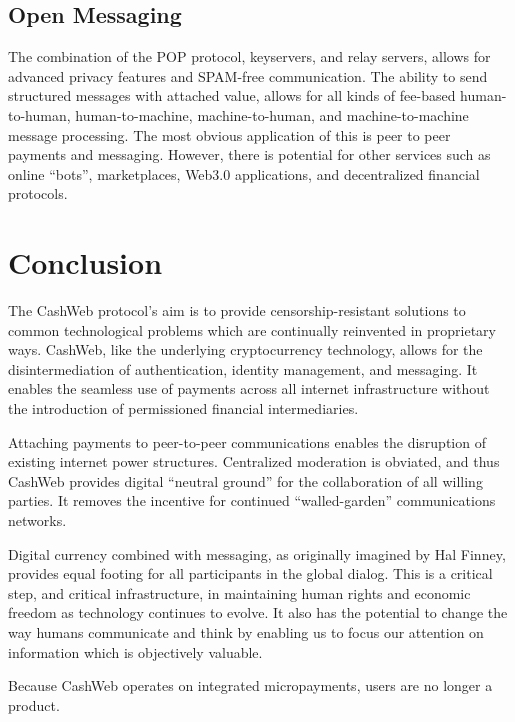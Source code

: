 \documentclass{article}
\begin{document}
\subsection{Open Messaging}

The combination of the POP protocol, keyservers, and relay servers, allows for advanced privacy features and SPAM-free communication. The ability to send structured messages with attached value, allows for all kinds of fee-based human-to-human, human-to-machine, machine-to-human, and machine-to-machine message processing. The most obvious application of this is peer to peer payments and messaging. However, there is potential for other services such as online ``bots'', marketplaces, Web3.0 applications, and decentralized financial protocols.

\section{Conclusion}

The CashWeb protocol's aim is to provide censorship-resistant solutions to common technological problems which are continually reinvented in proprietary ways. CashWeb, like the underlying cryptocurrency technology, allows for the disintermediation of authentication, identity management, and messaging. It enables the seamless use of payments across all internet infrastructure without the introduction of permissioned financial intermediaries.

Attaching payments to peer-to-peer communications enables the disruption of existing internet power structures. Centralized moderation is obviated, and thus CashWeb provides digital ``neutral ground'' for the collaboration of all willing parties. It removes the incentive for continued ``walled-garden'' communications networks.

Digital currency combined with messaging, as originally imagined by Hal Finney\supercite{finney2004rpow}, provides equal footing for all participants in the global dialog. This is a critical step, and critical infrastructure, in maintaining human rights and economic freedom as technology continues to evolve. It also has the potential to change the way humans communicate and think by enabling us to focus our attention on information which is objectively valuable.

Because CashWeb operates on integrated micropayments, users are no longer a product.

\printbibliography
\end{document}

